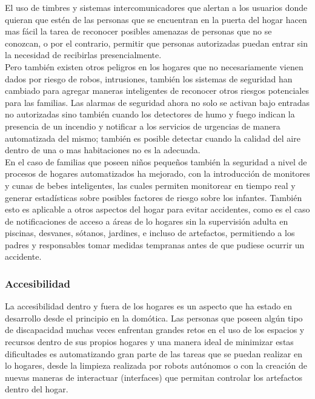 El uso de timbres y sistemas intercomunicadores que alertan a los usuarios donde quieran que estén de las personas que se encuentran en la puerta del hogar  hacen mas fácil la tarea de reconocer posibles amenazas de personas que no se conozcan, o por el contrario, permitir que personas autorizadas puedan entrar sin la necesidad de recibirlas presencialmente.\\

Pero también existen otros peligros en los hogares que no necesariamente vienen dados por riesgo de robos, intrusiones, también  los sistemas de seguridad han cambiado para agregar maneras inteligentes  de reconocer otros riesgos potenciales para las familias. Las alarmas de seguridad ahora no solo se activan bajo entradas no autorizadas sino también cuando los detectores de humo y fuego indican la presencia de un incendio y notificar a los servicios de urgencias de manera automatizada del mismo; también es posible detectar cuando la calidad del aire dentro de una o mas habitaciones no es la adecuada. \\

En el caso de familias que poseen niños pequeños también la seguridad a nivel de procesos de hogares automatizados ha mejorado, con la introducción de monitores y cunas de bebes inteligentes, las cuales permiten monitorear en tiempo real y generar estadísticas sobre posibles factores de riesgo sobre los infantes. También esto es aplicable a otros aspectos del hogar para evitar accidentes, como es el caso de notificaciones de acceso a áreas de lo hogares sin la supervisión adulta en piscinas, desvanes, sótanos,  jardines, e incluso de artefactos, permitiendo a los padres y responsables tomar medidas tempranas antes de que pudiese ocurrir un accidente.  

\subsubsection{Accesibilidad}
La accesibilidad dentro y fuera de los hogares es un aspecto que ha estado en desarrollo desde el principio en la domótica. Las personas que poseen algún tipo de discapacidad muchas veces enfrentan grandes retos en el uso de los espacios y recursos dentro de sus propios hogares y una manera ideal de minimizar estas dificultades es automatizando gran parte de las tareas que se puedan realizar en lo hogares, desde la limpieza realizada por robots autónomos o con la creación de nuevas maneras de interactuar (interfaces) que permitan controlar los artefactos dentro del hogar.\\

